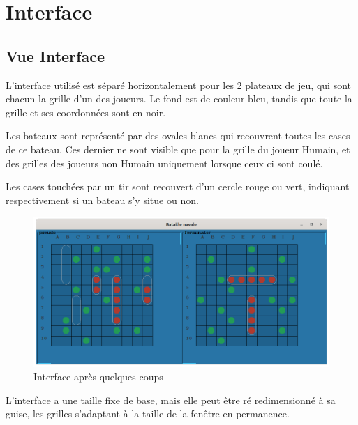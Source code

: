 \section{Interface}
\subsection{Vue Interface}

\par L'interface utilisé est séparé horizontalement pour les 2 plateaux de jeu, qui sont chacun la grille d'un des joueurs. Le fond est de couleur bleu, tandis que toute la grille et ses coordonnées sont en noir. 
\par Les bateaux sont représenté par des ovales blancs qui recouvrent toutes les cases de ce bateau. Ces dernier ne sont visible que pour la grille du joueur Humain, et des grilles des joueurs non Humain uniquement lorsque ceux ci sont coulé.
\par Les cases touchées par un tir sont recouvert d'un cercle rouge ou vert, indiquant respectivement si un bateau s'y situe ou non.
\begin{figure}[H]
    \centering
    \includegraphics[scale=0.35]{images/interface/PartieEnCours.png}
    \caption{\label{fig: PartieEnCoursI} Interface après quelques coups}
\end{figure}
\par L'interface a une taille fixe de base, mais elle peut être ré redimensionné à sa guise, les grilles s'adaptant à la taille de la fenêtre en permanence. 

